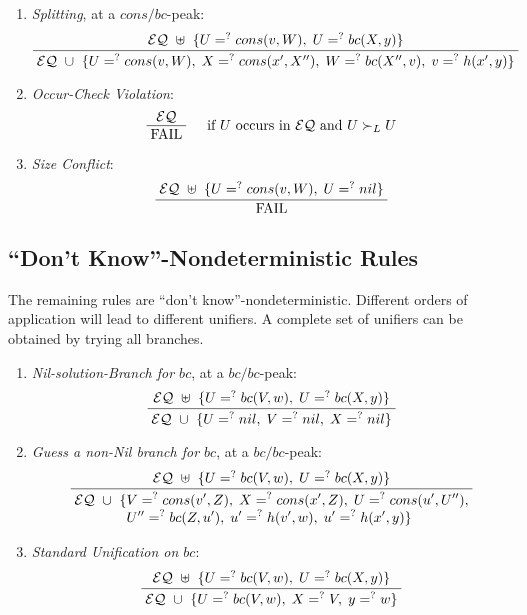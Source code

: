 \documentclass[11pt,twoside,titlepage]{article}
\newcommand{\ueq}{=_{}^?}
\newcommand{\EQ}{\mathcal{EQ}}
\newcommand{\Bc}{\mathit{bc}}
\newcommand{\Cons}{\mathit{cons}}
\newcommand{\Fail}{\mathrm{FAIL}}
\begin{document}
\begin{enumerate}[(L1), align=left, font=\bfseries, start=5]
    \item \emph{Splitting}, at a $\Cons/\Bc$-peak:
        \[\infer
        {\; \EQ ~ \cup ~ \{ U \ueq cons(v, W) , \; X \ueq cons(x', X''), \;
              W \ueq bc(X'', v), \; v \ueq h(x', y) \} \;}
        {\; \EQ ~ \uplus ~ \{ U \ueq cons(v, W), \; U \ueq bc(X, y) \} \;}
        \]

    \item \emph{Occur-Check Violation}:
        \[\infer[\quad \text{if } U \text{ occurs in } \EQ
                 \text{ and }  U \succ_L U]
            {\; \Fail \;}
            {\; \EQ \;}
        \]

    \item \emph{Size Conflict}:
        \[\infer
            {\; \Fail \;}
            {\; \EQ ~ \uplus ~ \{ U \ueq cons(v, W), \; U \ueq nil \} \;}
        \]
\end{enumerate}

\subsection{\texorpdfstring{``Don't Know''}{"Don't Know"}-Nondeterministic Rules}

The remaining rules are ``don't know''-nondeterministic. Different orders of
application will lead to different unifiers. A complete set of unifiers can
be obtained by trying all branches.
\begin{enumerate}[(L1), align=left, font=\bfseries, start=8]
    \item \emph{Nil-solution-Branch for $\Bc$}, at a $\Bc/\Bc$-peak:
        \[\infer
            {\; \EQ ~ \cup ~ \{ U \ueq nil, \; V \ueq nil, \; X \ueq nil \} \;}
            {\; \EQ ~ \uplus ~ \{ U \ueq bc(V, w), \; U \ueq bc(X, y) \} \;}
        \]

    \item \emph{Guess a non-Nil branch for $\Bc$}, at a $\Bc/\Bc$-peak:
        \[\infer
            {\; \begin{aligned}
                \EQ ~ \cup ~ \{
                & V \ueq cons(v', Z), \; X \ueq cons(x', Z), \;
                  U \ueq cons(u', U''), \\[-4pt]
                & U'' \ueq bc(Z, u'), \; u' \ueq h(v', w), \;
                  u' \ueq h(x', y) \}
            \end{aligned} \;}
            {\; \EQ ~ \uplus ~ \{ U \ueq bc(V, w), \; U \ueq bc(X, y) \} \;}
        \]

    \item \emph{Standard Unification on $\Bc$}:
        \[\infer
            {\; \EQ ~ \cup ~ \{ U \ueq bc(V, w), \; X \ueq V, \; y \ueq w \} \;}
            {\; \EQ ~ \uplus ~ \{ U \ueq bc(V, w), \; U \ueq bc(X, y) \} \;}
        \]
\end{enumerate}
\end{document}
